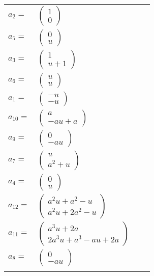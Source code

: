 \documentclass[1p]{elsarticle_modified}
\theoremstyle{definition}
\begin{document}
\begin{tabular}{m{7pt} m{180pt} m{7pt} m{180pt} }
\flushright $a_{2}=$&$\begin{pmatrix}1\\0\end{pmatrix}$ \\
\flushright $a_{5}=$&$\begin{pmatrix}0\\u\end{pmatrix}$ \\
\flushright $a_{3}=$&$\begin{pmatrix}1\\u+1\end{pmatrix}$ \\
\flushright $a_{6}=$&$\begin{pmatrix}u\\u\end{pmatrix}$ \\
\flushright $a_{1}=$&$\begin{pmatrix}- u\\- u\end{pmatrix}$ \\
\flushright $a_{10}=$&$\begin{pmatrix}a\\- a u+a\end{pmatrix}$ \\
\flushright $a_{9}=$&$\begin{pmatrix}0\\- a u\end{pmatrix}$ \\
\flushright $a_{7}=$&$\begin{pmatrix}u\\a^2+u\end{pmatrix}$ \\
\flushright $a_{4}=$&$\begin{pmatrix}0\\u\end{pmatrix}$ \\
\flushright $a_{12}=$&$\begin{pmatrix}a^2 u+a^2- u\\a^2 u+2 a^2- u\end{pmatrix}$ \\
\flushright $a_{11}=$&$\begin{pmatrix}a^3 u+2 a\\2 a^3 u+a^3- a u+2 a\end{pmatrix}$ \\
\flushright $a_{8}=$&$\begin{pmatrix}0\\- a u\end{pmatrix}$\\&\end{tabular}
\end{document}
